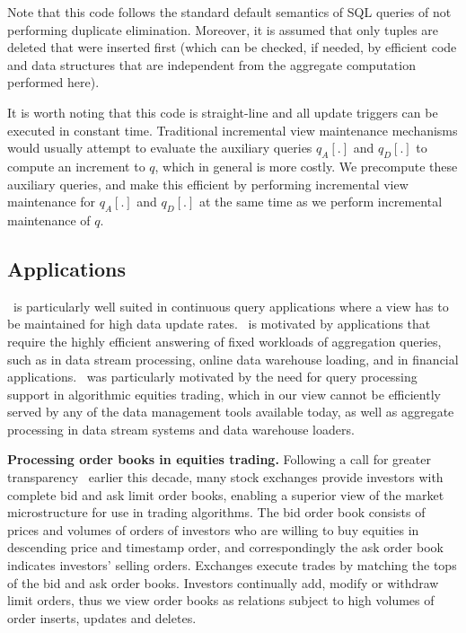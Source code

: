 \begin{example}
Note that this code follows the standard default semantics of SQL queries of not
performing duplicate elimination. Moreover, it is assumed that only tuples are
deleted that were inserted first (which can be checked, if needed, by efficient
code and data structures that are independent from the aggregate computation
performed here).

It is worth noting that this code is straight-line and all update triggers can
be executed in constant time. Traditional incremental view maintenance
mechanisms would usually attempt to evaluate the auxiliary queries $q_A[.]$ and
$q_D[.]$ to compute an increment to $q$, which in general is more costly.  We
precompute these auxiliary queries, and make this efficient by performing
incremental view maintenance for $q_A[.]$ and $q_D[.]$ at the same time as we
perform incremental maintenance of $q$.
\end{example}



\subsection{Applications}


\compiler\ is particularly well suited in continuous query applications where a
view has to be maintained for high data update rates. \compiler\ is
motivated by applications that require the highly efficient answering of fixed
workloads of aggregation queries, such as in data stream processing, online data
warehouse loading, and in financial applications. \compiler\ was
particularly motivated by the need for query processing support in algorithmic
equities trading, which in our view cannot be efficiently served by any of the
data management tools available today, as well as aggregate processing in data
stream systems and data warehouse loaders.


\medskip


\textbf{Processing order books in equities trading.}  Following a call for
greater transparency~\cite{sec-orderbook:00} earlier this decade, many stock
exchanges provide investors with complete bid and ask limit order books,
enabling a superior view of the market microstructure for use in trading
algorithms. The bid order book consists of prices and volumes of orders of
investors who are willing to buy equities in descending price and timestamp
order, and correspondingly the ask order book indicates investors' selling
orders. Exchanges execute trades by matching the tops of the bid and ask order
books. Investors continually add, modify or withdraw limit orders, thus we view
order books as relations subject to high volumes of order inserts, updates and
deletes.

